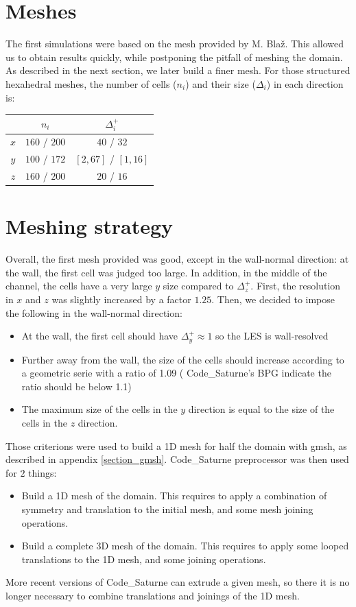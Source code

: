 \documentclass[a4paper]{article}
\newcommand{\CS}{%
   {\fontfamily{ppl}\fontshape{it}\selectfont Code\_Saturne}\xspace}
\begin{document}
\section{Meshes}
The first simulations were based on the mesh provided by M. Bla\v{z}. This allowed us to obtain results quickly, while postponing the pitfall of meshing the domain. As described in the next section, we later build a finer mesh. For those structured hexahedral meshes, the number of cells ($n_i$) and their size ($\Delta_i$) in each direction is:
\begin{tabular}{|c|c|c|}
\hline
    & $n_i$ & $\Delta_i^+$ \\ \hline
$x$ & $160$ / $200$ & $40$ / $32$ \\ \hline
$y$ & $100$ / $172$ & $[2,67]$ / $[1,16]$ \\ \hline
$z$ & $160$ / $200$ & $20$ / $16$ \\ \hline
\end{tabular}

\section{Meshing strategy}
Overall, the first mesh provided was good, except in the wall-normal direction: at the wall, the first cell was judged too large. In addition, in the middle of the channel, the cells have a very large $y$ size compared to $\Delta_z^+$. First, the resolution in $x$ and $z$ was slightly increased by a factor $1.25$. Then, we decided to impose the following in the wall-normal direction:
\begin{itemize}
\item At the wall, the first cell should have $\Delta_y^+ \approx 1$ so the LES is wall-resolved
\item Further away from the wall, the size of the cells should increase according to a geometric serie with a ratio of 1.09 (\CS's BPG indicate the ratio should be below 1.1)
\item The maximum size of the cells in the $y$ direction is equal to the size of the cells in the $z$ direction.
\end{itemize}

Those criterions were used to build a 1D mesh for half the domain with gmsh, as described in appendix \ref{section_gmsh}. \CS preprocessor was then used for $2$ things:
\begin{itemize}
\item Build a 1D mesh of the domain. This requires to apply a combination of symmetry and translation to the initial mesh, and some mesh joining operations.
\item Build a complete 3D mesh of the domain. This requires to apply some looped translations to the 1D mesh, and some joining operations.
\end{itemize}
More recent versions of \CS can extrude a given mesh, so there it is no longer necessary to combine translations and joinings of the 1D mesh.
\end{document}

